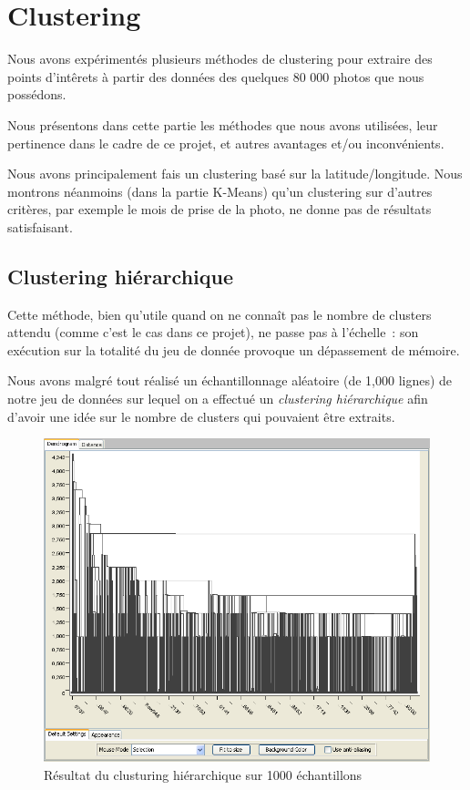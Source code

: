 \chapter{Clustering}

Nous avons expérimentés plusieurs méthodes de clustering pour extraire des points d'intêrets à partir des données
des quelques 80 000 photos que nous possédons.

Nous présentons dans cette partie les méthodes que nous avons utilisées, leur pertinence dans le cadre de ce projet, et
autres avantages et/ou inconvénients.

Nous avons principalement fais un clustering basé sur la latitude/longitude. Nous montrons néanmoins (dans la partie K-Means) qu'un clustering sur d'autres critères, par exemple le mois de prise de la photo, ne donne pas de résultats satisfaisant.

\section{Clustering hiérarchique}
    Cette méthode, bien qu'utile quand on ne connaît pas le nombre de clusters
    attendu (comme c'est le cas dans ce projet), ne passe pas à l'échelle~:
    son exécution sur la totalité du jeu de donnée provoque un dépassement de mémoire.

    Nous avons malgré tout réalisé un échantillonnage aléatoire (de 1,000 lignes)
    de notre jeu de données sur lequel on a effectué un \textit{clustering hiérarchique}
    afin d'avoir une idée sur le nombre de clusters qui pouvaient être extraits.

    \begin{figure}[H]
        \centering
        \includegraphics[scale=0.3]{../screenshots/hierarchical_clustering_1000_samples.png}
        \caption{Résultat du clusturing hiérarchique sur 1000 échantillons}
        \label{diagram:hierarchical_clustering_1000_samples}
    \end{figure}

